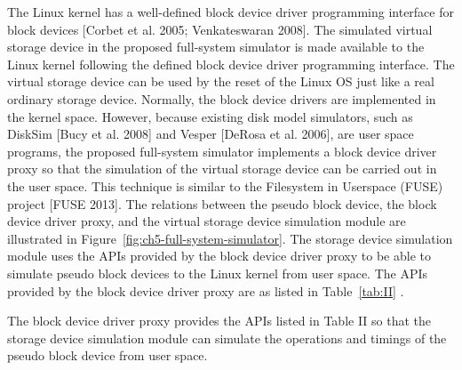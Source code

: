 The Linux kernel has a well-defined block device driver programming interface for block devices [Corbet et al. 2005; Venkateswaran 2008]. The simulated virtual storage device in the proposed full-system simulator is made available to the Linux kernel following the defined block device driver programming interface. The virtual storage device can be used by the reset of the Linux OS just like a real ordinary storage device. Normally, the block device drivers are implemented in the kernel space. However, because existing disk model simulators, such as DiskSim [Bucy et al. 2008] and Vesper [DeRosa et al. 2006], are user space programs, the proposed full-system simulator implements a block device driver proxy so that the simulation of the virtual storage device can be carried out in the user space. This technique is similar to the Filesystem in Userspace (FUSE) project [FUSE 2013]. The relations between the pseudo block device, the block device driver proxy, and the virtual storage device simulation module are illustrated in Figure~\ref{fig:ch5-full-system-simulator}. The storage device simulation module uses the APIs provided by the block device driver proxy to be able to simulate pseudo block devices to the Linux kernel from user space. The APIs provided by the block device driver proxy are as listed in Table~\ref{tab:II} .  

The block device driver proxy provides the APIs listed in Table II so that the storage device simulation module can simulate the operations and timings of the pseudo block device from user space.


